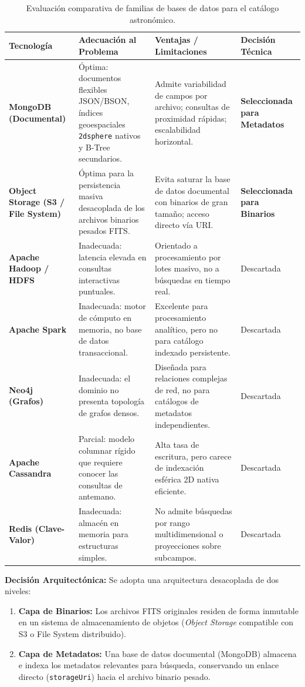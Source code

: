 \documentclass[10pt]{article}
\begin{document}
\begin{table}[ht]
\centering
\small
\caption{Evaluación comparativa de familias de bases de datos para el catálogo astronómico.}
\label{tab:comparacion_nosql}
\begin{tabularx}{\textwidth}{>{\bfseries}p{3cm}XX>{\centering\arraybackslash}p{2.5cm}}
\toprule
Tecnología & Adecuación al Problema & Ventajas / Limitaciones & Decisión Técnica \\
\midrule
MongoDB (Documental) & Óptima: documentos flexibles JSON/BSON, índices geoespaciales \texttt{2dsphere} nativos y B-Tree secundarios. & Admite variabilidad de campos por archivo; consultas de proximidad rápidas; escalabilidad horizontal. & \textbf{Seleccionada para Metadatos} \\
\addlinespace
Object Storage (S3 / File System) & Óptima para la persistencia masiva desacoplada de los archivos binarios pesados FITS. & Evita saturar la base de datos documental con binarios de gran tamaño; acceso directo vía URI. & \textbf{Seleccionada para Binarios} \\
\midrule
Apache Hadoop / HDFS & Inadecuada: latencia elevada en consultas interactivas puntuales. & Orientado a procesamiento por lotes masivo, no a búsquedas en tiempo real. & Descartada \\
\addlinespace
Apache Spark & Inadecuada: motor de cómputo en memoria, no base de datos transaccional. & Excelente para procesamiento analítico, pero no para catálogo indexado persistente. & Descartada \\
\addlinespace
Neo4j (Grafos) & Inadecuada: el dominio no presenta topología de grafos densos. & Diseñada para relaciones complejas de red, no para catálogos de metadatos independientes. & Descartada \\
\addlinespace
Apache Cassandra & Parcial: modelo columnar rígido que requiere conocer las consultas de antemano. & Alta tasa de escritura, pero carece de indexación esférica 2D nativa eficiente. & Descartada \\
\addlinespace
Redis (Clave-Valor) & Inadecuada: almacén en memoria para estructuras simples. & No admite búsquedas por rango multidimensional o proyecciones sobre subcampos. & Descartada \\
\bottomrule
\end{tabularx}
\end{table}

\textbf{Decisión Arquitectónica:} Se adopta una arquitectura desacoplada de dos niveles:
\begin{enumerate}
    \item \textbf{Capa de Binarios:} Los archivos FITS originales residen de forma inmutable en un sistema de almacenamiento de objetos (\textit{Object Storage} compatible con S3 o File System distribuido).
    \item \textbf{Capa de Metadatos:} Una base de datos documental (MongoDB) almacena e indexa los metadatos relevantes para búsqueda, conservando un enlace directo (\texttt{storageUri}) hacia el archivo binario pesado.
\end{enumerate}
\end{document}
